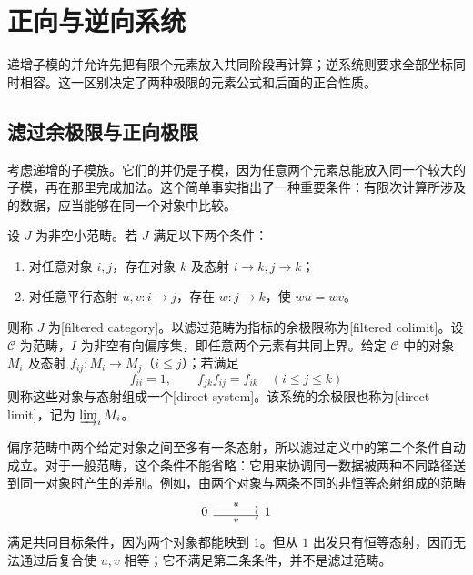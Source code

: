 
\section{正向与逆向系统}
\label{b4:sec:0203}

递增子模的并允许先把有限个元素放入共同阶段再计算；逆系统则要求全部坐标同时相容。这一区别决定了两种极限的元素公式和后面的正合性质。

%
%

\subsection{滤过余极限与正向极限}
\label{b4:subsec:0203:01}

考虑递增的子模族。它们的并仍是子模，因为任意两个元素总能放入同一个较大的子模，再在那里完成加法。这个简单事实指出了一种重要条件：有限次计算所涉及的数据，应当能够在同一个对象中比较。

\begin{definition}[滤过范畴与正向系统]\label{b4:def:filtered-category}
	设 \(J\) 为非空小范畴。若 \(J\) 满足以下两个条件：
	\begin{enumerate}
		\item 对任意对象 \(i,j\)，存在对象 \(k\) 及态射 \(i\rightarrow k,j\rightarrow k\)；
		\item 对任意平行态射 \(u,v:i\rightarrow j\)，存在 \(w:j\rightarrow k\)，使 \(wu=wv\)。
	\end{enumerate}
	则称 \(J\) 为[filtered category]。以滤过范畴为指标的余极限称为[filtered colimit]。设 \(\mathcal C\) 为范畴，\(I\) 为非空有向偏序集，即任意两个元素有共同上界。给定 \(\mathcal C\) 中的对象 \(M_i\) 及态射 \(f_{ij}:M_i\rightarrow M_j\)（\(i\le j\)）；若满足
	\[
		f_{ii}=1,\qquad f_{jk}f_{ij}=f_{ik}\quad(i\le j\le k)
	\]
	则称这些对象与态射组成一个[direct system]。该系统的余极限也称为[direct limit]，记为 \(\varinjlim_i M_i\)。
\end{definition}

偏序范畴中两个给定对象之间至多有一条态射，所以滤过定义中的第二个条件自动成立。对于一般范畴，这个条件不能省略：它用来协调同一数据被两种不同路径送到同一对象时产生的差别。例如，由两个对象与两条不同的非恒等态射组成的范畴
\[
	\begin{tikzcd}[column sep=large]
		0\arrow[r,shift left=0.6ex,"u"]\arrow[r,shift right=0.6ex,"v"']&1
	\end{tikzcd}
\]
满足共同目标条件，因为两个对象都能映到 \(1\)。但从 \(1\) 出发只有恒等态射，因而无法通过后复合使 \(u,v\) 相等；它不满足第二条条件，并不是滤过范畴。

